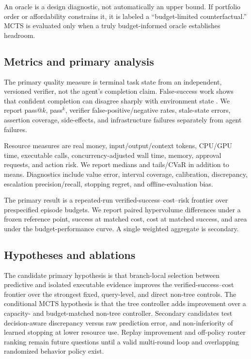 \documentclass[10pt,twocolumn]{article}
\begin{document}
An oracle is a design diagnostic, not automatically an upper bound. If
portfolio order or affordability constrains it, it is labeled a
``budget-limited counterfactual.'' MCTS is evaluated only when a truly
budget-informed oracle establishes headroom.

\subsection{Metrics and primary analysis}

The primary quality measure is terminal task state from an independent,
versioned verifier, not the agent's completion claim. False-success work shows
that confident completion can disagree sharply with environment state
\citep{advani2026false}. We report pass@\(k\), pass\(^{k}\), verifier
false-positive/negative rates, stale-state errors, assertion coverage,
side-effects, and infrastructure failures separately from agent failures.

Resource measures are real money, input/output/context tokens, CPU/GPU time,
executable calls, concurrency-adjusted wall time, memory, approval requests,
and action risk. We report medians and tails/CVaR in addition to means.
Diagnostics include value error, interval coverage, calibration, discrepancy,
escalation precision/recall, stopping regret, and offline-evaluation bias.

The primary result is a repeated-run verified-success--cost--risk frontier over
prespecified episode budgets. We report paired hypervolume differences under a
frozen reference point, success at matched cost, cost at matched success, and
area under the budget-performance curve. A single weighted aggregate is
secondary.

\subsection{Hypotheses and ablations}

The candidate primary hypothesis is that branch-local selection between
predictive and isolated executable evidence improves the verified-success--cost
frontier over the strongest fixed, query-level, and direct non-tree controls.
The conditional MCTS hypothesis is that the tree controller adds improvement
over a capacity- and budget-matched non-tree controller. Secondary candidates
test decision-aware discrepancy versus raw prediction error, and
non-inferiority of learned stopping at lower resource use. Replay improvement
and off-policy router ranking remain future questions until a valid multi-round
loop and overlapping randomized behavior policy exist.
\end{document}
